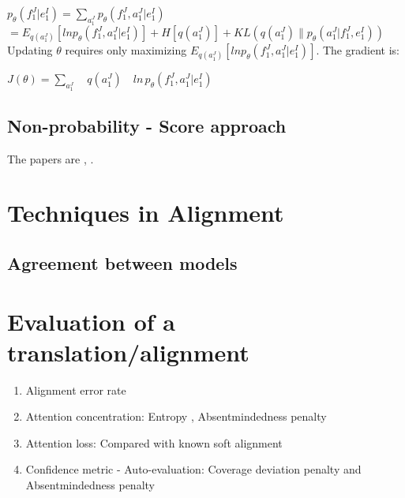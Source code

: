 \documentclass{article}
\begin{document}
$p_{\theta}(f_1^J|e_1^I) = \sum_{a_1^J} p_{\theta}(f_1^J, a_1^J|e_1^I)$ \\

$ = E_{q(a_1^J)} [ln p_{\theta}(f_1^J, a_1^J|e_1^I) ] + H[q(a_1^J)] + KL(q(a_1^J) \| p_{\theta}(a_1^J|f_1^J,e_1^I) ) $ \\

Updating $\theta$ requires only maximizing $E_{q(a_1^J)} [ln p_{\theta}(f_1^J, a_1^J|e_1^I) ]$. The gradient is: \\

$ J(\theta) = \sum_{a_1^J} \quad q(a_1^J)\quad ln \, p_{\theta}(f_1^J, a_1^J|e_1^I)  $












\subsection{Non-probability - Score approach}
The papers are \cite{Yang13word}, \cite{Tamura14recurrent}.

\section{Techniques in Alignment}

\subsection{Agreement between models}

\section{Evaluation of a translation/alignment}
\begin{enumerate}
\item Alignment error rate
\item Attention concentration: Entropy \citep{Ghader2017what}, Absentmindedness penalty \citep{Rikters2017confidence}
\item Attention loss: Compared with known soft alignment
\item Confidence metric - Auto-evaluation: Coverage deviation penalty and Absentmindedness penalty \citep{Rikters2017confidence}

\end{enumerate}


\pagebreak 



\end{document}
